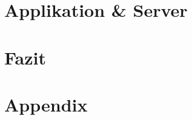 \documentclass[a4paper, 11pt, oneside, onecolumn, final, openany]{report}
\begin{document}
    \chapter{Applikation \& Server}
    

    \chapter{Fazit}
    

    \newpage

    
    

    \chapter{Appendix}
    
\end{document}
